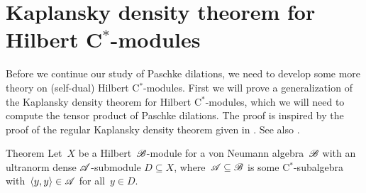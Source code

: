 \documentclass[b]{subfiles}
\begin{document}
\section{Kaplansky density theorem for Hilbert C$^*$-modules}
\begin{parsec}%
\begin{point}%
Before we continue our study of Paschke dilations,
    we need to develop some more theory on (self-dual) Hilbert C$^*$-modules.
First we will prove a generalization of the Kaplansky density
    theorem for Hilbert C$^*$-modules,
    which we will need to compute the tensor product of Paschke dilations.
The proof is inspired by the proof of the regular Kaplansky density theorem
    given in \cite[Thm.~1.2.2]{arveson2012invitation}.
See also .
\end{point}
\begin{point}{Theorem}%
Let~$X$ be a Hilbert~$\mathscr{B}$-module for a von Neumann algebra~$\mathscr{B}$
    with an ultranorm dense $\mathscr{A}$-submodule $D \subseteq X$,
    where~$\mathscr{A} \subseteq \mathscr{B}$ is some C$^*$-subalgebra
    with~$\langle y,y \rangle \in \mathscr{A}$ for all~$y \in D$.


\end{point}
\end{parsec}
\end{document}
